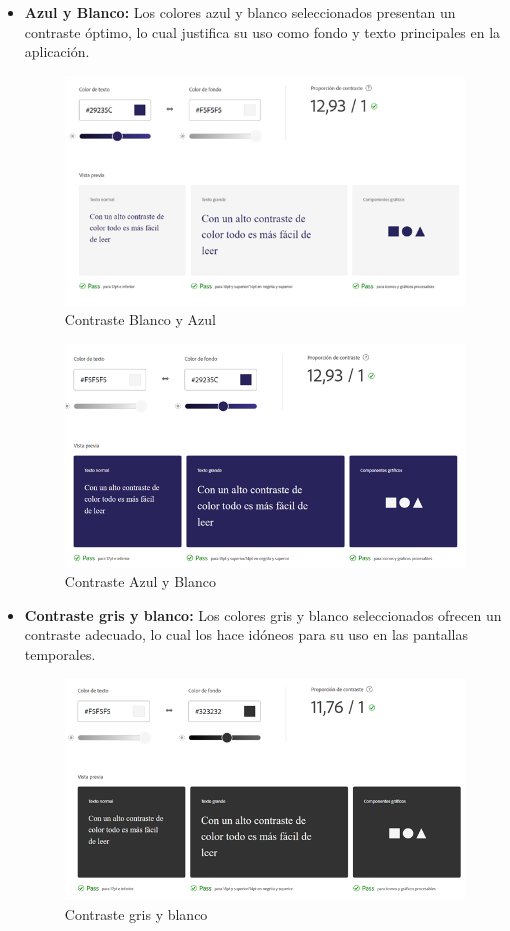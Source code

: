 \begin{itemize}

    \item \textbf{Azul y Blanco:} Los colores azul y blanco seleccionados presentan un contraste óptimo, lo cual justifica su uso como fondo y texto principales en la aplicación. 

    \begin{figure} [H]
        \centering
        \includegraphics[width=0.6\linewidth]{figuras/contraste_azul_blanco.png}
        \caption{Contraste Blanco y Azul}
        \label{fig:enter-label}
    \end{figure}


    \begin{figure} [H]
        \centering
        \includegraphics[width=0.6\linewidth]{figuras/contraste_blanco_azul.png}
        \caption{Contraste Azul y Blanco}
        \label{fig:enter-label}
    \end{figure}

  
    \item \textbf{Contraste gris y blanco:} Los colores gris y blanco seleccionados ofrecen un contraste adecuado, lo cual los hace idóneos para su uso en las pantallas temporales. 

    \begin{figure} [H]
        \centering
        \includegraphics[width=0.6\linewidth]{figuras/contraste_gris_blanco.png}
        \caption{Contraste gris y blanco}
        \label{fig:enter-label}
    \end{figure}
    

\end{itemize}
